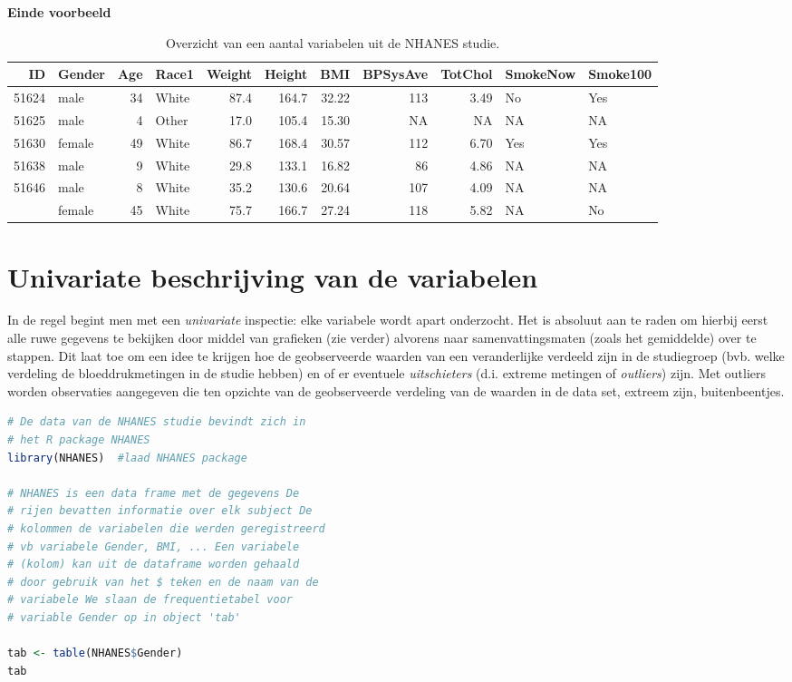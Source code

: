 \documentclass[
  12pt,dutch,coursenotes]{book}
\theoremstyle{definition}
\theoremstyle{definition}
\theoremstyle{definition}
\theoremstyle{definition}
\theoremstyle{remark}
\begin{document}
\textbf{Einde voorbeeld}

\begin{table}

\caption{\label{tab:nhanesDatExpl}Overzicht van een aantal variabelen uit de NHANES studie.}
\centering
\begin{tabular}[t]{rlrlrrrrrll}
\toprule
ID & Gender & Age & Race1 & Weight & Height & BMI & BPSysAve & TotChol & SmokeNow & Smoke100\\
\midrule
51624 & male & 34 & White & 87.4 & 164.7 & 32.22 & 113 & 3.49 & No & Yes\\
51625 & male & 4 & Other & 17.0 & 105.4 & 15.30 & NA & NA & NA & NA\\
51630 & female & 49 & White & 86.7 & 168.4 & 30.57 & 112 & 6.70 & Yes & Yes\\
51638 & male & 9 & White & 29.8 & 133.1 & 16.82 & 86 & 4.86 & NA & NA\\
51646 & male & 8 & White & 35.2 & 130.6 & 20.64 & 107 & 4.09 & NA & NA\\
\addlinespace
51647 & female & 45 & White & 75.7 & 166.7 & 27.24 & 118 & 5.82 & NA & No\\
\bottomrule
\end{tabular}
\end{table}

\hypertarget{sec:univar}{%
\section{Univariate beschrijving van de variabelen}\label{sec:univar}}

In de regel begint men met een \emph{univariate} inspectie: elke variabele
wordt apart onderzocht. Het is absoluut aan te raden om hierbij eerst alle
ruwe gegevens te bekijken door middel van grafieken (zie verder) alvorens
naar samenvattingsmaten (zoals het gemiddelde) over te stappen. Dit laat toe
om een idee te krijgen hoe de geobserveerde waarden van een veranderlijke
verdeeld zijn in de studiegroep (bvb. welke verdeling de bloeddrukmetingen in de studie hebben)
en of er eventuele \emph{uitschieters} (d.i. extreme
metingen of \emph{outliers}) zijn. Met outliers worden observaties
aangegeven die ten opzichte van de geobserveerde verdeling van de waarden in
de data set, extreem zijn, buitenbeentjes.

\begin{lstlisting}[language=R]
# De data van de NHANES studie bevindt zich in
# het R package NHANES
library(NHANES)  #laad NHANES package

# NHANES is een data frame met de gegevens De
# rijen bevatten informatie over elk subject De
# kolommen de variabelen die werden geregistreerd
# vb variabele Gender, BMI, ... Een variabele
# (kolom) kan uit de dataframe worden gehaald
# door gebruik van het $ teken en de naam van de
# variabele We slaan de frequentietabel voor
# variable Gender op in object 'tab'

tab <- table(NHANES$Gender)
tab
\end{lstlisting}
\end{document}
